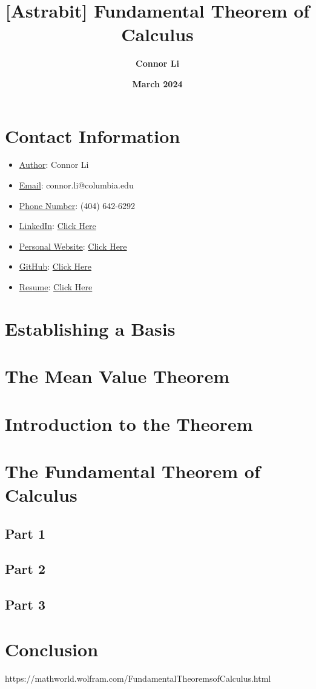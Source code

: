 \documentclass[8pt]{extarticle}
\title{\textbf{[Astrabit] Fundamental Theorem of Calculus}}
\author{\textbf{Connor Li}}
\date{\textbf{March 2024}}
\begin{document}
\maketitle


\section*{Contact Information}
\begin{itemize}
    \item \underline{Author}: Connor Li
    \item \underline{Email}: connor.li@columbia.edu
    \item \underline{Phone Number}: (404) 642-6292
    \item \underline{LinkedIn}: \href{https://www.linkedin.com/in/connor-li-4871a71a9/}{Click Here}
    \item \underline{Personal Website}: \href{https://connorli18.github.io/}{Click Here}
    \item \underline{GitHub}: \href{https://github.com/connorli18}{Click Here}
    \item \underline{Resume}: \href{https://drive.google.com/file/d/1G4QryPZy70d9OCKWtcJPA6su5gIfjmIe/view?usp=sharing}{Click Here}
\end{itemize}
\vspace{2cm}
\tableofcontents

\pagebreak
\section{Establishing a Basis}


\section{The Mean Value Theorem}

\section{Introduction to the Theorem}


\section{The Fundamental Theorem of Calculus}
\subsection{Part 1}
\subsection{Part 2}
\subsection{Part 3}

\section{Conclusion}



https://mathworld.wolfram.com/FundamentalTheoremsofCalculus.html
\end{document}

